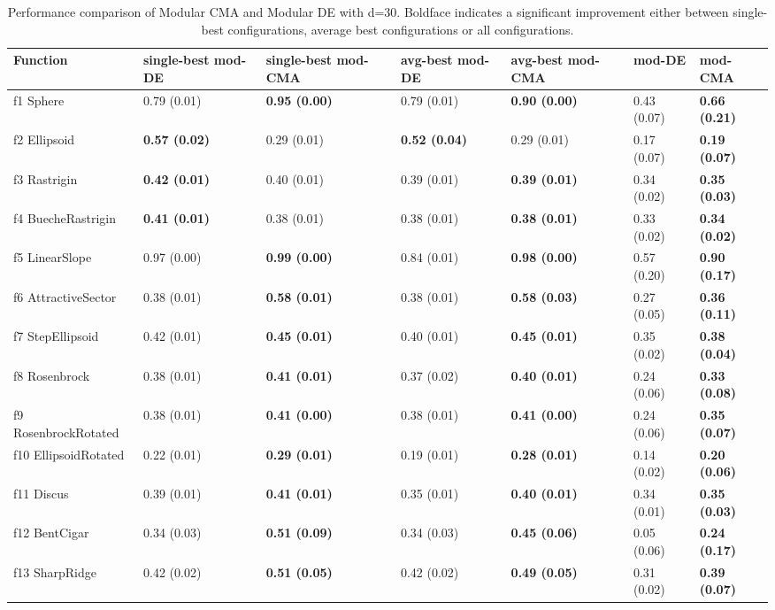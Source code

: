 \begin{table}
\caption{Performance comparison of Modular CMA and Modular DE with d=30. Boldface indicates a significant improvement either between single-best configurations, average best configurations or all configurations.}
\begin{tabular}{lllllll}
\toprule
Function & single-best mod-DE & single-best mod-CMA & avg-best mod-DE & avg-best mod-CMA & mod-DE & mod-CMA \\
\midrule
f1 Sphere & 0.79 (0.01) & \textbf{0.95 (0.00)} & 0.79 (0.01) & \textbf{0.90 (0.00)} & 0.43 (0.07) & \textbf{0.66 (0.21)} \\
f2 Ellipsoid & \textbf{0.57 (0.02)} & 0.29 (0.01) & \textbf{0.52 (0.04)} & 0.29 (0.01) & 0.17 (0.07) & \textbf{0.19 (0.07)} \\
f3 Rastrigin & \textbf{0.42 (0.01)} & 0.40 (0.01) & 0.39 (0.01) & \textbf{0.39 (0.01)} & 0.34 (0.02) & \textbf{0.35 (0.03)} \\
f4 BuecheRastrigin & \textbf{0.41 (0.01)} & 0.38 (0.01) & 0.38 (0.01) & \textbf{0.38 (0.01)} & 0.33 (0.02) & \textbf{0.34 (0.02)} \\
f5 LinearSlope & 0.97 (0.00) & \textbf{0.99 (0.00)} & 0.84 (0.01) & \textbf{0.98 (0.00)} & 0.57 (0.20) & \textbf{0.90 (0.17)} \\
f6 AttractiveSector & 0.38 (0.01) & \textbf{0.58 (0.01)} & 0.38 (0.01) & \textbf{0.58 (0.03)} & 0.27 (0.05) & \textbf{0.36 (0.11)} \\
f7 StepEllipsoid & 0.42 (0.01) & \textbf{0.45 (0.01)} & 0.40 (0.01) & \textbf{0.45 (0.01)} & 0.35 (0.02) & \textbf{0.38 (0.04)} \\
f8 Rosenbrock & 0.38 (0.01) & \textbf{0.41 (0.01)} & 0.37 (0.02) & \textbf{0.40 (0.01)} & 0.24 (0.06) & \textbf{0.33 (0.08)} \\
f9 RosenbrockRotated & 0.38 (0.01) & \textbf{0.41 (0.00)} & 0.38 (0.01) & \textbf{0.41 (0.00)} & 0.24 (0.06) & \textbf{0.35 (0.07)} \\
f10 EllipsoidRotated & 0.22 (0.01) & \textbf{0.29 (0.01)} & 0.19 (0.01) & \textbf{0.28 (0.01)} & 0.14 (0.02) & \textbf{0.20 (0.06)} \\
f11 Discus & 0.39 (0.01) & \textbf{0.41 (0.01)} & 0.35 (0.01) & \textbf{0.40 (0.01)} & 0.34 (0.01) & \textbf{0.35 (0.03)} \\
f12 BentCigar & 0.34 (0.03) & \textbf{0.51 (0.09)} & 0.34 (0.03) & \textbf{0.45 (0.06)} & 0.05 (0.06) & \textbf{0.24 (0.17)} \\
f13 SharpRidge & 0.42 (0.02) & \textbf{0.51 (0.05)} & 0.42 (0.02) & \textbf{0.49 (0.05)} & 0.31 (0.02) & \textbf{0.39 (0.07)} \\

\end{tabular}
\end{table}
